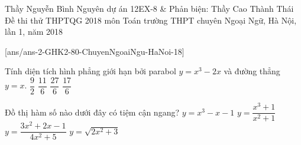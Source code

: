 \begin{name}
	{ Thầy Nguyễn Bình Nguyên dự án 12EX-8 \& Phản biện: Thầy Cao Thành Thái}
	{Đề thi thử THPTQG 2018 môn Toán trường THPT chuyên Ngoại Ngữ, Hà Nội, lần 1, năm 2018  }
\end{name}
\setcounter{ex}{0}
[ans/ans-2-GHK2-80-ChuyenNgoaiNgu-HaNoi-18]
\begin{ex}%
Tính diện tích hình phẳng giới hạn bởi parabol $ y=x^3-2x $ và đường thẳng $ y=x $.
\choice
{\True $\dfrac{9}{2}$}
{$\dfrac{11}{6}$}
{$\dfrac{27}{6}$}
{$\dfrac{17}{6}$}
\end{ex}
\begin{ex}%
Đồ thị hàm số nào dưới đây có tiệm cận ngang?
	\choice
	{$y=x^3-x-1$}
	{$y=\dfrac{x^3+1}{x^2+1}$}
	{\True $y=\dfrac{3x^2+2x-1}{4x^2+5}$}
	{$y=\sqrt{2x^2+3}$}
\end{ex}

